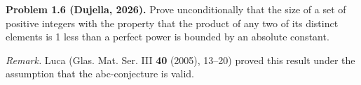\textbf{Problem 1.6 (Dujella, 2026).} Prove unconditionally that the size of a set of positive integers with the property that the product of any two of its distinct elements is 1 less than a perfect power is bounded by an absolute constant.

\medskip

\textit{Remark.} Luca (Glas. Mat. Ser. III \textbf{40} (2005), 13--20) proved this result under the assumption that the abc-conjecture is valid.
